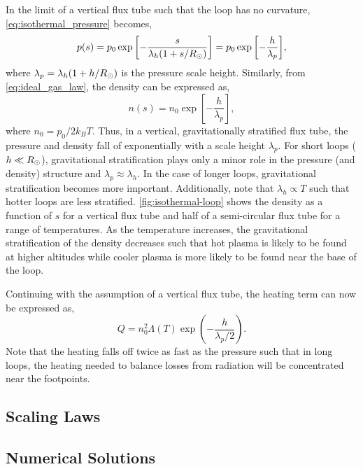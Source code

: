 In the limit of a vertical flux tube such that the loop has no curvature, \autoref{eq:isothermal_pressure} becomes,
\begin{equation*}
    p(s) = p_0\exp{\left[-\frac{s}{\lambda_h(1 + s/R_\odot)}\right]} = p_0\exp{\left[-\frac{h}{\lambda_p}\right]},
\end{equation*}
where $\lambda_p=\lambda_h(1 + h/R_\odot)$ is the pressure scale height. Similarly, from \autoref{eq:ideal_gas_law}, the density can be expressed as,
\begin{equation*}
    n(s) = n_0\exp{\left[-\frac{h}{\lambda_p}\right]},
\end{equation*} 
where $n_0=p_0/2k_BT$. Thus, in a vertical, gravitationally stratified flux tube, the pressure and density fall of exponentially with a scale height $\lambda_p$. For short loops ($h\ll R_\odot$), gravitational stratification plays only a minor role in the pressure (and density) structure and $\lambda_p\approx\lambda_h$. In the case of longer loops, gravitational stratification becomes more important. Additionally, note that $\lambda_h\propto T$ such that hotter loops are less stratified. \autoref{fig:isothermal-loop} shows the density as a function of $s$ for a vertical flux tube and half of a semi-circular flux tube for a range of temperatures. As the temperature increases, the gravitational stratification of the density decreases such that hot plasma is likely to be found at higher altitudes while cooler plasma is more likely to be found near the base of the loop.

Continuing with the assumption of a vertical flux tube, the heating term can now be expressed as,
\begin{equation}
    Q = n_0^2 \Lambda(T) \exp{\left(-\frac{h}{\lambda_p/2}\right)}.
\end{equation}
Note that the heating falls off twice as fast as the pressure such that in long loops, the heating needed to balance losses from radiation will be concentrated near the footpoints.

\subsection{Scaling Laws}\label{sec:scaling_laws}


\subsection{Numerical Solutions}\label{sec:hydrostatic_numerical}

